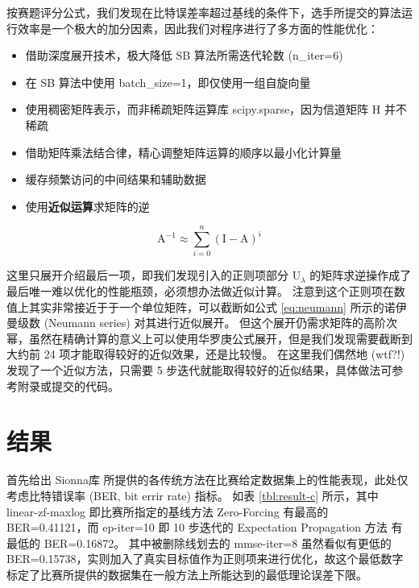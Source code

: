 \documentclass[withoutpreface,bwprint]{cumcmthesis}
\begin{document}
按赛题评分公式，我们发现在比特误差率超过基线的条件下，选手所提交的算法运行效率是一个极大的加分因素，因此我们对程序进行了多方面的性能优化：

\begin{itemize}
\item 借助深度展开技术，极大降低 SB 算法所需迭代轮数 (n\_iter=6)
\item 在 SB 算法中使用 batch\_size=1，即仅使用一组自旋向量
\item 使用稠密矩阵表示，而非稀疏矩阵运算库 scipy.sparse，因为信道矩阵 $ \mathrm H $ 并不稀疏
\item 借助矩阵乘法结合律，精心调整矩阵运算的顺序以最小化计算量
\item 缓存频繁访问的中间结果和辅助数据
\item 使用\textbf{近似运算}求矩阵的逆
\end{itemize}

\begin{equation}
\mathrm A^{-1} \approx \sum\limits_{i=0}^n (\mathrm I - \mathrm A)^i
\label{eq:neumann}
\end{equation}

这里只展开介绍最后一项，即我们发现引入的正则项部分 $ \mathrm U_\lambda $ 的矩阵求逆操作成了最后唯一难以优化的性能瓶颈，必须想办法做近似计算。
注意到这个正则项在数值上其实非常接近于于一个单位矩阵，可以截断如公式 \ref{eq:neumann} 所示的诺伊曼级数 (Neumann series) 对其进行近似展开。
但这个展开仍需求矩阵的高阶次幂，虽然在精确计算的意义上可以使用华罗庚公式展开，但是我们发现需要截断到大约前 24 项才能取得较好的近似效果，还是比较慢。
在这里我们偶然地 (wtf?!) 发现了一个近似方法，只需要 5 步迭代就能取得较好的近似结果，具体做法可参考附录或提交的代码。


\section{结果}

首先给出 Sionna库 \cite{sionna2022} 所提供的各传统方法在比赛给定数据集上的性能表现，此处仅考虑比特错误率 (BER, bit errir rate) 指标。
如表 \ref{tbl:result-c} 所示，其中 linear-zf-maxlog 即比赛所指定的基线方法 Zero-Forcing 有最高的 BER=0.41121，而 ep-iter=10 即 10 步迭代的 Expectation Propagation 方法 \cite{Wang2020} 有最低的 BER=0.16872。
其中被删除线划去的 mmse-iter=8 虽然看似有更低的 BER=0.15738，实则加入了真实目标值作为正则项来进行优化，故这个最低数字标定了比赛所提供的数据集在一般方法上所能达到的最低理论误差下限。
\end{document}

